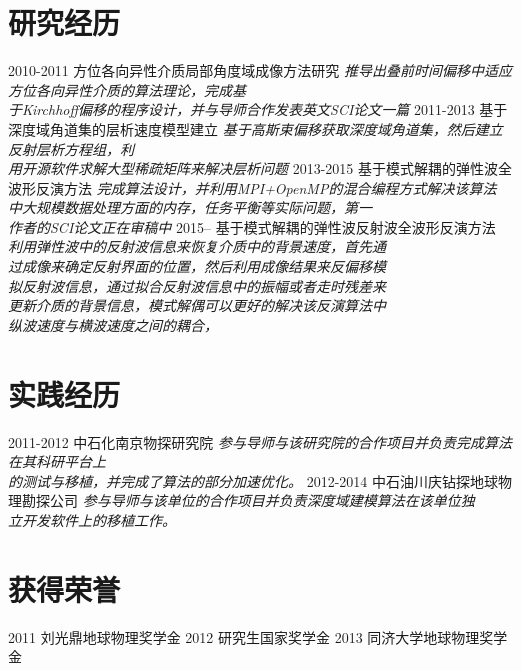 \documentclass[]{friggeri-cv}
\begin{document}
\section{研究经历}

\begin{entrylist}
  \entry
    {2010-2011}
    {方位各向异性介质局部角度域成像方法研究}
	{\emph{推导出叠前时间偏移中适应方位各向异性介质的算法理论，完成基\\
	于Kirchhoff偏移的程序设计，并与导师合作发表英文SCI论文一篇}}
  \entry
    {2011-2013}
    {基于深度域角道集的层析速度模型建立}
    {\emph{基于高斯束偏移获取深度域角道集，然后建立反射层析方程组，利\\
		用开源软件求解大型稀疏矩阵来解决层析问题}}
  \entry
    {2013-2015}
    {基于模式解耦的弹性波全波形反演方法}
    {\emph{
		完成算法设计，并利用MPI+OpenMP的混合编程方式解决该算法
		中大规模数据处理方面的内存，任务平衡等实际问题，第一\\
		作者的SCI论文正在审稿中
	}}
  \entry
    {2015--}
    {基于模式解耦的弹性波反射波全波形反演方法}
	{\emph{
		利用弹性波中的反射波信息来恢复介质中的背景速度，首先通\\
		过成像来确定反射界面的位置，然后利用成像结果来反偏移模\\
		拟反射波信息，通过拟合反射波信息中的振幅或者走时残差来\\
		更新介质的背景信息，模式解偶可以更好的解决该反演算法中\\
		纵波速度与横波速度之间的耦合，\\
	}}
\end{entrylist}

\section{实践经历}
\begin{entrylist}
  \entry
    {2011-2012}
    {中石化南京物探研究院}
	{\emph{
		参与导师与该研究院的合作项目并负责完成算法在其科研平台上\\
		的测试与移植，并完成了算法的部分加速优化。
	}}
  \entry
    {2012-2014}
    {中石油川庆钻探地球物理勘探公司}
	{\emph{
		参与导师与该单位的合作项目并负责深度域建模算法在该单位独\\
		立开发软件上的移植工作。
	}}
\end{entrylist}
\section{获得荣誉}
\begin{entrylist}
  \entryTwo
    {2011}
    {刘光鼎地球物理奖学金}
  \entryTwo
    {2012}
	{研究生国家奖学金}
  \entryTwo
    {2013}
    {同济大学地球物理奖学金}
\par\vspace{\parskip}
\end{entrylist}
\end{document}
